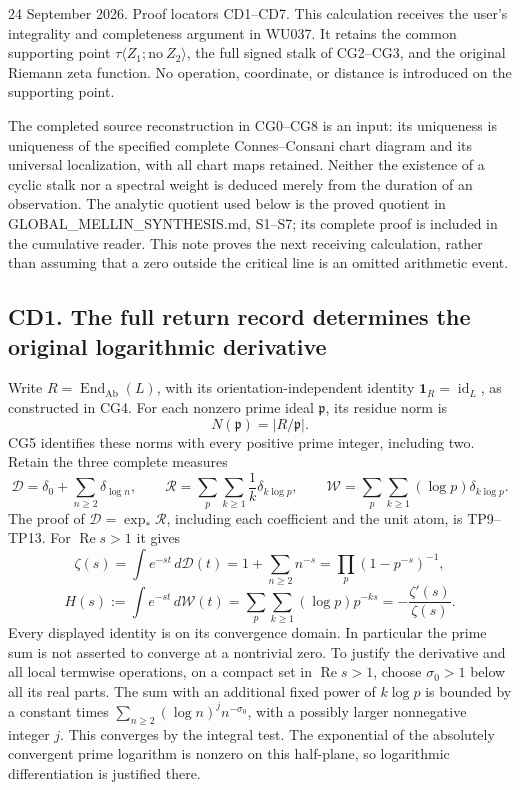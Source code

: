 \documentclass[
]{article}
\begin{document}
24 September 2026. Proof locators CD1--CD7. This calculation receives
the user's integrality and completeness argument in WU037. It retains
the common supporting point \(\tau\langle Z_1;\mathrm{no}\ Z_2\rangle\),
the full signed stalk of CG2--CG3, and the original Riemann zeta
function. No operation, coordinate, or distance is introduced on the
supporting point.

The completed source reconstruction in CG0--CG8 is an input: its
uniqueness is uniqueness of the specified complete Connes--Consani chart
diagram and its universal localization, with all chart maps retained.
Neither the existence of a cyclic stalk nor a spectral weight is deduced
merely from the duration of an observation. The analytic quotient used
below is the proved quotient in GLOBAL\_MELLIN\_SYNTHESIS.md, S1--S7;
its complete proof is included in the cumulative reader. This note
proves the next receiving calculation, rather than assuming that a zero
outside the critical line is an omitted arithmetic event.

\subsection{CD1. The full return record determines the original
logarithmic
derivative}\label{cd1.-the-full-return-record-determines-the-original-logarithmic-derivative}

Write \(R=\operatorname{End}_{\mathrm{Ab}}(L)\), with its
orientation-independent identity \(\mathbf1_R=\operatorname{id}_L\), as
constructed in CG4. For each nonzero prime ideal \(\mathfrak p\), its
residue norm is \[
N(\mathfrak p)=|R/\mathfrak p|.
\tag{CD1.1}
\] CG5 identifies these norms with every positive prime integer,
including two. Retain the three complete measures \[
\mathcal D=\delta_0+\sum_{n\ge2}\delta_{\log n},\qquad
\mathcal R=\sum_p\sum_{k\ge1}\frac1k\delta_{k\log p},\qquad
\mathcal W=\sum_p\sum_{k\ge1}(\log p)\delta_{k\log p}.
\tag{CD1.2}
\] The proof of \(\mathcal D=\exp_*\mathcal R\), including each
coefficient and the unit atom, is TP9--TP13. For
\(\operatorname{Re}s>1\) it gives \[
\zeta(s)=\int e^{-st}\,d\mathcal D(t)
=1+\sum_{n\ge2}n^{-s}
=\prod_p(1-p^{-s})^{-1},
\tag{CD1.3}
\] \[
H(s):=\int e^{-st}\,d\mathcal W(t)
=\sum_p\sum_{k\ge1}(\log p)p^{-ks}
=-\frac{\zeta'(s)}{\zeta(s)}.
\tag{CD1.4}
\] Every displayed identity is on its convergence domain. In particular
the prime sum is not asserted to converge at a nontrivial zero. To
justify the derivative and all local termwise operations, on a compact
set in \(\operatorname{Re}s>1\), choose \(\sigma_0>1\) below all its
real parts. The sum with an additional fixed power of \(k\log p\) is
bounded by a constant times \(\sum_{n\ge2}(\log n)^j n^{-\sigma_0}\),
with a possibly larger nonnegative integer \(j\). This converges by the
integral test. The exponential of the absolutely convergent prime
logarithm is nonzero on this half-plane, so logarithmic differentiation
is justified there.
\end{document}
